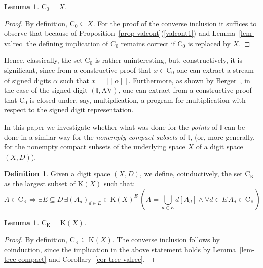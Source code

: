 \documentclass[microtype]{jloganal}
\theoremstyle{plain}
\newtheorem{lemma}[theorem]{Lemma}
\theoremstyle{definition}
\newtheorem{definition}[theorem]{Definition}
\newcommand{\II}{\mathbb{I}}
\newcommand{\AV}{\mathrm{AV}}
\newcommand{\coco}{\mathrm{C}}
\newcommand{\compact}{\mathrm{K}}
\newcommand{\val}[1]{[\![#1]\!]}
\begin{document}
\begin{lemma}
\label{lem-coco-space}
$\coco_0 = X$.
\end{lemma} 
\begin{proof}
By definition, $\coco_0 \subseteq X$. For the proof of the converse inclusion 
it suffices to observe that because of Proposition~\ref{prop-valcont}(\ref{valcont1}) and Lemma~\ref{lem-valrec} the defining implication of $\coco_0$ remains
correct if $\coco_0$ is replaced by $X$.
\end{proof}
Hence, classically, the set $\coco_0$ is rather uninteresting, 
but, constructively, it is significant, since 
from a constructive proof that $x\in\coco_0$ one can extract a  
stream of signed digits $\alpha$ such that $x = \val{\alpha}$.
Furthermore, as shown by Berger~\cite{Berger11}, in the case of 
the signed digit $(\II,\AV)$, one can extract
from a constructive proof that $\coco_0$ is closed under, say, 
multiplication, a program for multiplication with respect
to the signed digit representation.

In this paper we investigate whether what was done for the \emph{points} of
$\II$ can be done in a similar way for the \emph{nonempty compact subsets} of 
$\II$, (or, more generally, for the nonempty compact subsets of the 
underlying space $X$ of a digit space $(X,D)$).
\begin{definition}
\label{def-coco-compact}
Given a digit space $(X,D)$, we define, coinductively, the set 
$\coco_{\compact}$ as the largest subset of $\compact(X)$ such that:
\[ A \in \coco_{\compact} \Rightarrow
    \exists E \subseteq D\, \exists (A_d)_{d\in E} \in \compact(X)^E \ 
  (A = \bigcup_{d\in E} d[A_d] \land \forall d\in E\,A_d\in\coco_{\compact})\]
\end{definition}
\begin{lemma}
\label{lem-coco-compact}
$\coco_{\compact}=\compact(X)$.
\end{lemma}
\begin{proof}
By definition, $\coco_{\compact}\subseteq\compact(X)$.
The converse inclusion follows by coinduction, since
the implication in the above statement holds by Lemma~\ref{lem-tree-compact} and Corollary~\ref{cor-tree-valrec}.
\end{proof}
\end{document}
